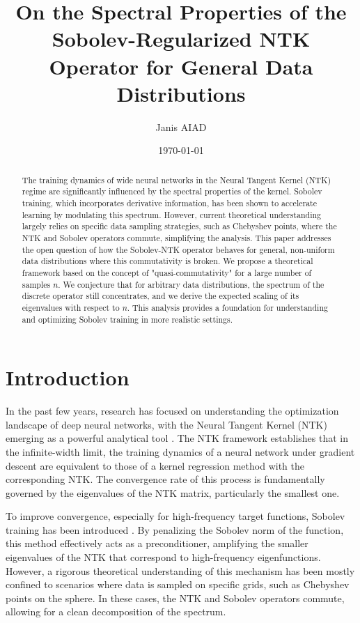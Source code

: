 \documentclass{article}
\title{On the Spectral Properties of the Sobolev-Regularized NTK Operator for General Data Distributions}
\author{Janis AIAD}
\date{\today}
\begin{document}
\maketitle

\begin{abstract}
The training dynamics of wide neural networks in the Neural Tangent Kernel (NTK) regime are significantly influenced by the spectral properties of the kernel. Sobolev training, which incorporates derivative information, has been shown to accelerate learning by modulating this spectrum. However, current theoretical understanding largely relies on specific data sampling strategies, such as Chebyshev points, where the NTK and Sobolev operators commute, simplifying the analysis. This paper addresses the open question of how the Sobolev-NTK operator behaves for general, non-uniform data distributions where this commutativity is broken. We propose a theoretical framework based on the concept of "quasi-commutativity" for a large number of samples $n$. We conjecture that for arbitrary data distributions, the spectrum of the discrete operator still concentrates, and we derive the expected scaling of its eigenvalues with respect to $n$. This analysis provides a foundation for understanding and optimizing Sobolev training in more realistic settings.
\end{abstract}

\section{Introduction}

In the past few years, research has focused on understanding the optimization landscape of deep neural networks, with the Neural Tangent Kernel (NTK) emerging as a powerful analytical tool \cite{jacot2018neural}. The NTK framework establishes that in the infinite-width limit, the training dynamics of a neural network under gradient descent are equivalent to those of a kernel regression method with the corresponding NTK. The convergence rate of this process is fundamentally governed by the eigenvalues of the NTK matrix, particularly the smallest one.

To improve convergence, especially for high-frequency target functions, Sobolev training has been introduced \cite{yang2020sobolev}. By penalizing the Sobolev norm of the function, this method effectively acts as a preconditioner, amplifying the smaller eigenvalues of the NTK that correspond to high-frequency eigenfunctions. However, a rigorous theoretical understanding of this mechanism has been mostly confined to scenarios where data is sampled on specific grids, such as Chebyshev points on the sphere. In these cases, the NTK and Sobolev operators commute, allowing for a clean decomposition of the spectrum.
\end{document}
